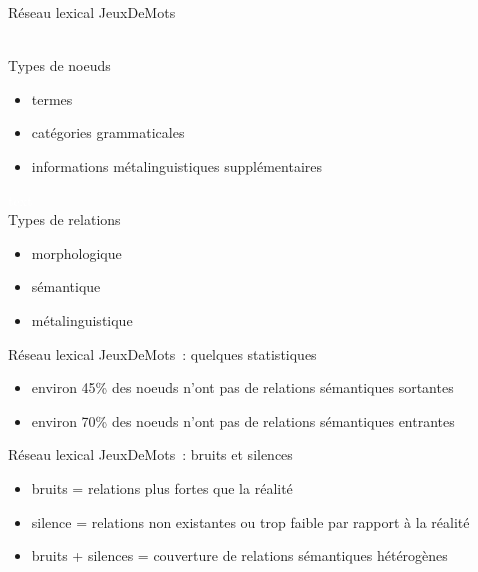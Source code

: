 \documentclass{beamer}
\begin{document}
\begin{frame}
\begin{center}
  Réseau lexical JeuxDeMots  \\\
  \end{center}

Types de noeuds
  \begin{itemize}
  \item termes
  \item catégories grammaticales
  \item informations métalinguistiques supplémentaires 
  \end{itemize}

  \textcolor{white}{text}\\
  Types de relations 
  \begin{itemize}
  \item morphologique
  \item sémantique
  \item métalinguistique
  \end{itemize}
  
\end{frame}

\begin{frame}
  Réseau lexical JeuxDeMots~: quelques statistiques
  \begin{itemize}
  \item environ 45\% des noeuds n'ont pas de relations sémantiques sortantes
  \item environ 70\% des noeuds n'ont pas de relations sémantiques entrantes
  \end{itemize}
\end{frame}

\begin{frame}
  Réseau lexical JeuxDeMots~: bruits et silences
  \begin{itemize}
  \item bruits = relations plus fortes que la réalité 
  \item silence = relations non existantes ou trop faible par rapport à la réalité 
  \item bruits + silences = couverture de relations sémantiques hétérogènes
  \end{itemize}
\end{frame}
\end{document}
